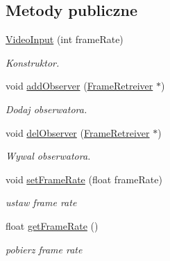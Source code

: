 \subsection*{Metody publiczne}
\begin{DoxyCompactItemize}
\item 
\hyperlink{class_video_input_a136409a2c510d131dd25b00796ebb9a6}{VideoInput} (int frameRate)
\begin{DoxyCompactList}\small\item\em Konstruktor. \item\end{DoxyCompactList}\item 
void \hyperlink{class_video_input_ac2370a0c1ea0d4b1ce36c2f9678530a4}{addObserver} (\hyperlink{class_frame_retreiver}{FrameRetreiver} $\ast$)
\begin{DoxyCompactList}\small\item\em Dodaj obserwatora. \item\end{DoxyCompactList}\item 
\hypertarget{class_video_input_afc3bab19893d3e49284ab8b8101b9d1f}{
void \hyperlink{class_video_input_afc3bab19893d3e49284ab8b8101b9d1f}{delObserver} (\hyperlink{class_frame_retreiver}{FrameRetreiver} $\ast$)}
\label{class_video_input_afc3bab19893d3e49284ab8b8101b9d1f}

\begin{DoxyCompactList}\small\item\em Wywal obserwatora. \item\end{DoxyCompactList}\item 
\hypertarget{class_video_input_a498cc39dce8940616e9d1811953bf920}{
void \hyperlink{class_video_input_a498cc39dce8940616e9d1811953bf920}{setFrameRate} (float frameRate)}
\label{class_video_input_a498cc39dce8940616e9d1811953bf920}

\begin{DoxyCompactList}\small\item\em ustaw frame rate \item\end{DoxyCompactList}\item 
\hypertarget{class_video_input_aa172de34ebd4e1f1e7c63548fb406f39}{
float \hyperlink{class_video_input_aa172de34ebd4e1f1e7c63548fb406f39}{getFrameRate} ()}
\label{class_video_input_aa172de34ebd4e1f1e7c63548fb406f39}

\begin{DoxyCompactList}\small\item\em pobierz frame rate \item\end{DoxyCompactList}\end{DoxyCompactItemize}
